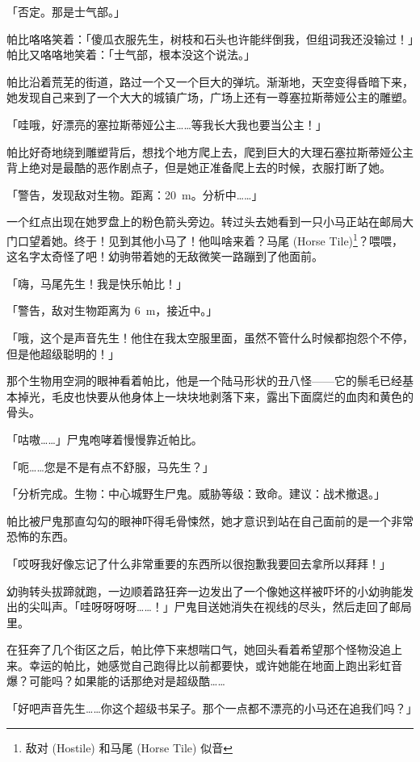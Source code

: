 「{\mt 否定。那是士气部。}」

帕比咯咯笑着：「傻瓜衣服先生，树枝和石头也许能绊倒我，但组词我还没输过！」帕比又咯咯地笑着：「士气部，根本没这个说法。」

帕比沿着荒芜的街道，路过一个又一个巨大的弹坑。渐渐地，天空变得昏暗下来，她发现自己来到了一个大大的城镇广场，广场上还有一尊塞拉斯蒂娅公主的雕塑。

「哇哦，好漂亮的塞拉斯蒂娅公主……等我长大我也要当公主！」

帕比好奇地绕到雕塑背后，想找个地方爬上去，爬到巨大的大理石塞拉斯蒂娅公主背上绝对是最酷的恶作剧点子，但是她正准备爬上去的时候，衣服打断了她。

「{\mt 警告，发现敌对生物。距离：\SI{20}{m}。分析中……}」

一个红点出现在她罗盘上的粉色箭头旁边。转过头去她看到一只小马正站在邮局大门口望着她。终于！见到其他小马了！他叫啥来着？马尾 (Horse Tile)\footnote{敌对 (Hostile) 和马尾 (Horse Tile) 似音}？喂喂，这名字太奇怪了吧！幼驹带着她的无敌微笑一路蹦到了他面前。

「嗨，马尾先生！我是快乐帕比！」

「{\mt 警告，敌对生物距离为 \SI{6}{m}，接近中。}」

「哦，这个是声音先生！他住在我太空服里面，虽然不管什么时候都抱怨个不停，但是他超级聪明的！」

那个生物用空洞的眼神看着帕比，他是一个陆马形状的丑八怪——它的鬃毛已经基本掉光，毛皮也快要从他身体上一块块地剥落下来，露出下面腐烂的血肉和黄色的骨头。

「咕嗷……」尸鬼咆哮着慢慢靠近帕比。

「呃……您是不是有点不舒服，马先生？」

「{\mt 分析完成。生物：中心城野生尸鬼。威胁等级：致命。建议：战术撤退。}」

帕比被尸鬼那直勾勾的眼神吓得毛骨悚然，她才意识到站在自己面前的是一个非常恐怖的东西。

「哎呀我好像忘记了什么非常重要的东西所以很抱歉我要回去拿所以拜拜！」

幼驹转头拔蹄就跑，一边顺着路狂奔一边发出了一个像她这样被吓坏的小幼驹能发出的尖叫声。「哇呀呀呀呀……！」尸鬼目送她消失在视线的尽头，然后走回了邮局里。

在狂奔了几个街区之后，帕比停下来想喘口气，她回头看着希望那个怪物没追上来。幸运的帕比，她感觉自己跑得比以前都要快，或许她能在地面上跑出彩虹音爆？可能吗？如果能的话那绝对是超级酷……

「好吧声音先生……你这个超级书呆子。那个一点都不漂亮的小马还在追我们吗？」

